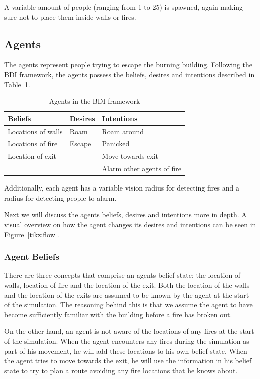 \documentclass[a4paper]{article}
\begin{document}
A variable amount of people (ranging from 1 to 25) is spawned, again making sure not to place them inside walls or fires. 

\subsection{Agents}
The agents represent people trying to escape the burning building.
Following the BDI framework, the agents possess the beliefs, desires and
intentions described in Table~\ref{tbl:bdi}.
\begin{table}[h!]
  \centering
  \begin{tabular}{lll}
    \toprule
    Beliefs & Desires & Intentions \\
    \midrule
    Locations of walls & Roam & Roam around \\
    Locations of fire & Escape & Panicked \\
    Location of exit &  & Move towards exit \\
    & & Alarm other agents of fire \\
    \bottomrule
  \end{tabular}
  \caption{Agents in the BDI framework}
  \label{tbl:bdi}
\end{table}

Additionally, each agent has a variable vision radius for detecting fires 
and a radius for detecting people to alarm.

Next we will discuss the agents beliefs, desires and intentions more in depth. A visual overview on how the agent changes its desires and intentions can be seen in Figure~\ref{tikz:flow}.


\subsubsection{Agent Beliefs}
There are three concepts that comprise an agents belief state: the location of walls, location of fire and the location of the exit. Both the location of the walls and  the location of the exits are assumed to be known by the agent at the start of the simulation. The reasoning behind this is that we assume the agent to have become sufficiently familiar with the building before a fire has broken out. 

On the other hand, an agent is not aware of the locations of any fires at the start of the simulation. When the agent encounters any fires during the simulation as part of his movement, he will add these locations to his own belief state. When the agent tries to move towards the exit, he will use the information in his belief state to try to plan a route avoiding any fire locations that he knows about. 
\end{document}

